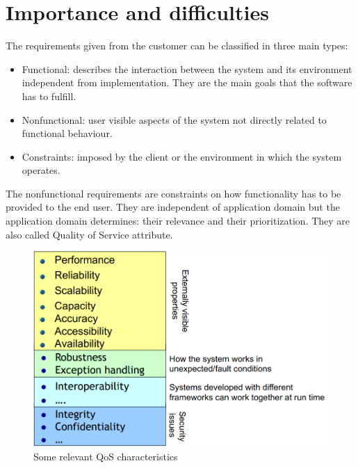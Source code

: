 \documentclass[12pt, a4paper]{report}
\theoremstyle{remark}
\begin{document}
\section{Importance and difficulties}
    The requirements given from the customer can be classified in three main types:
    \begin{itemize}
        \item Functional: describes the interaction between the system and its environment independent from implementation. They are the main goals that the software has to fulfill.
        \item Nonfunctional: user visible aspects of the system not directly related to functional behaviour.
        \item Constraints: imposed by the client or the environment in which the system operates.
    \end{itemize}
    The nonfunctional requirements are constraints on how functionality has to be provided to the end user. They are independent of application domain but the application domain determines: their relevance and their prioritization. They are also called Quality of Service attribute. 
    \begin{figure}
        \centering
        \includegraphics[width=1\linewidth]{images/QoS.png}
        \caption{Some relevant QoS characteristics}
    \end{figure}
\end{document}
